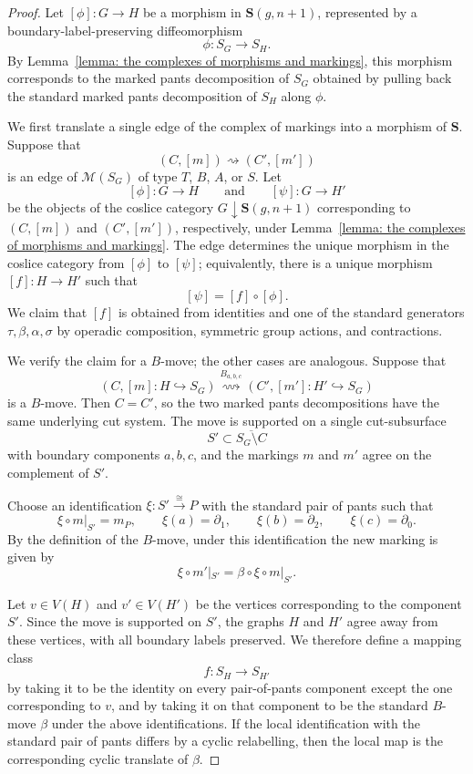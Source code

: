 \documentclass{amsart}
\newcommand{\bS}{\mathbf{S}}
\newcommand{\calM}{\mathcal{M}}
\theoremstyle{definition}
\numberwithin{equation}{section}
\begin{document}
\begin{proof} 
Let $[\phi]:G\to H$ be a morphism in $\bS(g,n+1)$, represented by a boundary-label-preserving diffeomorphism
\[
\phi:S_G\longrightarrow S_H.
\]
By Lemma~\ref{lemma: the complexes of morphisms and markings}, this morphism corresponds to the marked pants decomposition of $S_G$ obtained by pulling back the standard marked pants decomposition of $S_H$ along $\phi$.

We first translate a single edge of the complex of markings into a morphism of $\bS$. Suppose that
\[
(C,[m])\rightsquigarrow (C',[m'])
\]
is an edge of $\calM(S_G)$ of type $T$, $B$, $A$, or $S$. Let
\[
[\phi]:G\to H
\qquad\text{and}\qquad
[\psi]:G\to H'
\]
be the objects of the coslice category $G\downarrow\bS(g,n+1)$ corresponding to $(C,[m])$ and $(C',[m'])$, respectively, under Lemma~\ref{lemma: the complexes of morphisms and markings}. The edge determines the unique morphism in the coslice category from $[\phi]$ to $[\psi]$; equivalently, there is a unique morphism $[f]:H\to H'$ such that
\[
[\psi]=[f]\circ[\phi].
\]
We claim that $[f]$ is obtained from identities and one of the standard generators $\tau,\beta,\alpha,\sigma$ by operadic composition, symmetric group actions, and contractions.


We verify the claim for a $B$-move; the other cases are analogous. Suppose that
\[
(C,[m]:H\hookrightarrow S_G)
\overset{B_{a,b,c}}{\rightsquigarrow}
(C',[m']:H'\hookrightarrow S_G)
\]
is a $B$-move. Then $C=C'$, so the two marked pants decompositions have the same underlying cut system. The move is supported on a single cut-subsurface
\[
S'\subset \overline{S_G\setminus C}
\]
with boundary components $a,b,c$, and the markings $m$ and $m'$ agree on the complement of $S'$.

Choose an identification $\xi:S'\xrightarrow{\cong}P$ with the standard pair of pants such that
\[
\xi\circ m|_{S'}=m_P,\qquad
\xi(a)=\partial_1,\qquad
\xi(b)=\partial_2,\qquad
\xi(c)=\partial_0.
\]
By the definition of the $B$-move, under this identification the new marking is given by
\[
\xi\circ m'|_{S'}=\beta\circ \xi\circ m|_{S'}.
\]

Let $v\in V(H)$ and $v'\in V(H')$ be the vertices corresponding to the component $S'$. Since the move is supported on $S'$, the graphs $H$ and $H'$ agree away from these vertices, with all boundary labels preserved. We therefore define a mapping class
\[
f:S_H\longrightarrow S_{H'}
\]
by taking it to be the identity on every pair-of-pants component except the one corresponding to $v$, and by taking it on that component to be the standard $B$-move $\beta$ under the above identifications. If the local identification with the standard pair of pants differs by a cyclic relabelling, then the local map is the corresponding cyclic translate of $\beta$.


\end{proof}
\end{document}
